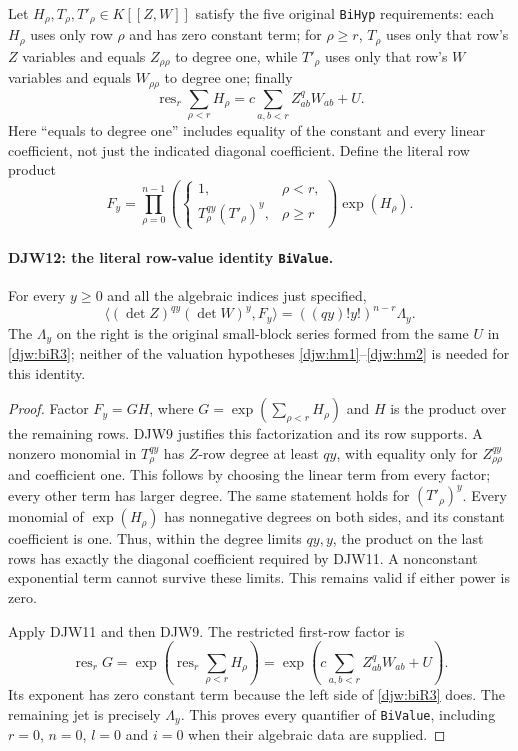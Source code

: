 \documentclass[11pt,a4paper]{article}
\numberwithin{equation}{section}
\theoremstyle{remark}\newtheorem{remark}[theorem]{Remark}
\begin{document}
Let $H_\rho,T_\rho,T'_\rho\in K[[Z,W]]$ satisfy the five
original \texttt{Bi\allowbreak Hyp} requirements:
each $H_\rho$ uses only row $\rho$ and has zero constant term;
for $\rho\ge r$, $T_\rho$ uses only that row's $Z$ variables
and equals $Z_{\rho\rho}$ to degree one, while $T'_\rho$
uses only that row's $W$ variables and equals $W_{\rho\rho}$
to degree one; finally
\begin{equation}
 \operatorname{res}_r\sum_{\rho<r}H_\rho
       =c\sum_{a,b<r}Z_{ab}^{q}W_{ab}+U.
 \label{djw:biR3}
\end{equation}
Here ``equals to degree one'' includes equality of the constant
and every linear coefficient, not just the indicated diagonal
coefficient.  Define the literal row product
\[
 F_y=\prod_{\rho=0}^{n-1}
       \left(\begin{cases}1,&\rho<r,\\
           T_\rho^{qy}(T'_\rho)^y,&\rho\ge r
       \end{cases}\right)\exp(H_\rho).
\]

\paragraph{DJW12: the literal row-value identity \texttt{Bi\allowbreak Value}.}
\label{claim:DJW12}
For every $y\ge0$ and all the algebraic indices just specified,
\begin{equation}
 \langle(\det Z)^{qy}(\det W)^y,F_y\rangle
       =((qy)!y!)^{n-r}\Lambda_y.
 \label{djw:bivalue}
\end{equation}
The $\Lambda_y$ on the right is the original small-block series
formed from the same $U$ in \eqref{djw:biR3}; neither of the
valuation hypotheses \eqref{djw:hm1}--\eqref{djw:hm2} is needed
for this identity.

\begin{proof}
Factor $F_y=GH$, where
$G=\exp(\sum_{\rho<r}H_\rho)$ and $H$ is the product over
the remaining rows.  DJW9 justifies this factorization and its
row supports.  A nonzero monomial in $T_\rho^{qy}$ has
$Z$-row degree at least $qy$, with equality only for
$Z_{\rho\rho}^{qy}$ and coefficient one.  This follows by choosing
the linear term from every factor; every other term has larger degree.
The same statement holds for $(T'_\rho)^y$.
Every monomial of $\exp(H_\rho)$ has nonnegative degrees on both
sides, and its constant coefficient is one.  Thus, within the degree
limits $qy,y$, the product on the last rows has exactly the diagonal
coefficient required by DJW11.  A nonconstant exponential term cannot
survive these limits.  This remains valid if either power is zero.

Apply DJW11 and then DJW9.  The restricted first-row factor is
\[
 \operatorname{res}_rG
   =\exp\left(\operatorname{res}_r\sum_{\rho<r}H_\rho\right)
   =\exp\left(c\sum_{a,b<r}Z_{ab}^{q}W_{ab}+U\right).
\]
Its exponent has zero constant term because the left side of
\eqref{djw:biR3} does.  The remaining jet is precisely $\Lambda_y$.
This proves every quantifier of \texttt{Bi\allowbreak Value}, including $r=0$,
$n=0$, $l=0$ and $i=0$ when their algebraic data are supplied.
\end{proof}
\end{document}
